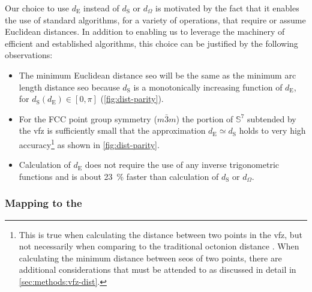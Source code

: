 \documentclass[final,twocolumn,12pt]{elsarticle}
\newcommand{\matlab}[1]{\mbox{\lstinline[style=Matlab-editor]{#1}}}
\begin{document}
Our choice to use $d_{\text{E}}$ instead of $d_{\text{S}}$ or $d_\Omega$ is motivated by the fact that it enables the use of standard algorithms, for a variety of operations, that require or assume Euclidean distances. In addition to enabling us to leverage the machinery of efficient and established algorithms, this choice can be justified by the following observations:
\begin{itemize}
    \item The minimum Euclidean distance \gls{seo} will be the same as the minimum arc length distance \gls{seo} because $d_{\text{S}}$ is a monotonically increasing function of $d_{\text{E}}$, for $d_{\text{S}}\!\left(d_{\text{E}}\right)\in[0,\pi]$ (\cref{fig:dist-parity}). 
    \item For the FCC point group symmetry ($m\bar{3}m$) the portion of $\mathbb{S}^7$ subtended by the \gls{vfz} is sufficiently small that the approximation $d_{\text{E}} \simeq d_{\text{S}}$ holds to very high accuracy\footnote{This is true when calculating the distance between two points in the \gls{vfz}, but not necessarily when comparing to the traditional octonion distance \cite{francisGeodesicOctonionMetric2019}. When calculating the minimum distance between \glspl{seo} of two points, there are additional considerations that must be attended to as discussed in detail in \cref{sec:methods:vfz-dist}.} as shown in \cref{fig:dist-parity}. 
    \item Calculation of $d_{\text{E}}$ does not require the use of any inverse trigonometric functions and is about \SI{23}{\percent} faster than calculation of $d_{\text{S}}$ or $d_\Omega$.
\end{itemize}

\subsubsection{Mapping  to the }
\label{sec:methods:proj}
\end{document}
